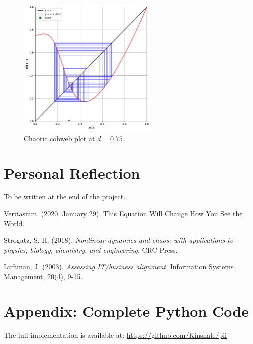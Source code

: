 \documentclass[a4paper, 10pt]{article}
\begin{document}
\begin{figure}[h]
    \centering
    \includegraphics[width=0.6\textwidth]{../images/int-cases/chaotic-cobweb.pdf}
    \caption{Chaotic cobweb plot at $d=0.75$}
    \label{fig:chaotic-cobweb}
\end{figure}

\clearpage

\section{Personal Reflection}
To be written at the end of the project. 

\begin{thebibliography}{9}
    Veritasium. (2020, January 29). \href{https://www.veritasium.com/videos/2020/1/29/this-equation-will-change-how-you-see-the-world}{This Equation Will Change How You See the World}.

	Strogatz, S. H. (2018). \textit{Nonlinear dynamics and chaos: with applications to physics, biology, chemistry, and engineering}. CRC Press.

	Luftman, J. (2003). \textit{Assessing IT/business alignment}. Information Systems Management, 20(4), 9-15.
\end{thebibliography}

\appendix
\section{Appendix: Complete Python Code}
The full implementation is available at: \url{https://github.com/Kinshale/pii}
\end{document}
